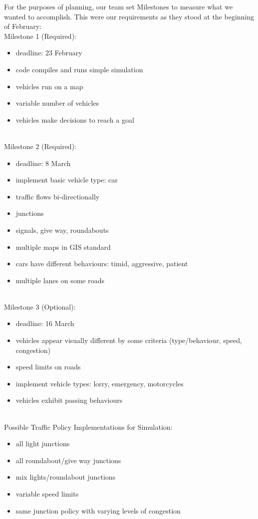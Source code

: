 \documentclass[11pt]{article}
\begin{document}
For the purposes of planning, our team set Milestones to measure what we wanted to accomplish. This were our requirements as they stood at the beginning of February: 
\\
Milestone 1 (Required):
\begin{itemize}
\item deadline: 23 February  \item code compiles and runs simple simulation \item vehicles run on a map  \item variable number of vehicles \item vehicles make decisions to reach a goal
\end{itemize}
\\
Milestone 2 (Required):
\begin{itemize}\itemsep0pt
\item deadline: 8 March
\item implement basic vehicle type: car
\item traffic flows bi-directionally
\item junctions
\item signals, give way, roundabouts
\item multiple maps in GIS standard
\item cars have different behaviours: timid, aggressive, patient
\item multiple lanes on some roads
\end{itemize}
\\
Milestone 3 (Optional):
\begin{itemize}\itemsep0pt
\item deadline: 16 March
\item vehicles appear visually different by some criteria (type/behaviour, speed, congestion)
\item speed limits on roads
\item implement vehicle types: lorry, emergency, motorcycles
\item vehicles exhibit passing behaviours
\end{itemize}
\\
Possible Traffic Policy Implementations for Simulation:
\begin{itemize}\itemsep0pt
\item all light junctions
\item all roundabout/give way junctions
\item mix lights/roundabout junctions
\item variable speed limits
\item same junction policy with varying levels of congestion
\end{itemize}
\\
\end{document}
